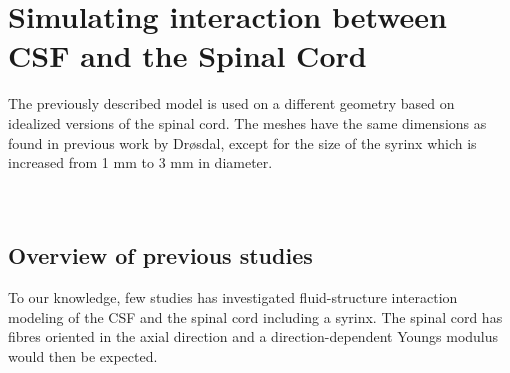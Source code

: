 \chapter{Simulating interaction between CSF and the Spinal Cord}
The previously described model is used on a different geometry based on idealized versions of the spinal cord. The meshes have the same dimensions as found in previous work by Dr{\o}sdal, \cite{Dros11} except for the size of the syrinx which is increased from 1 mm to 3 mm in diameter. 
\\
\\
\\
\section{Overview of previous studies}
To our knowledge, few studies has investigated fluid-structure interaction modeling of the CSF and the spinal cord including a syrinx. The spinal cord has fibres oriented in the axial direction and a direction-dependent Youngs modulus would then be expected. 

